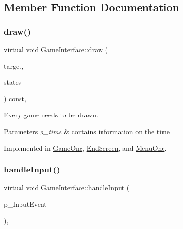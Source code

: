 \subsection{Member Function Documentation}
\mbox{\label{class_game_interface_ab33712e6b22b934982896ea0cab1699a}} 
\subsubsection{\texorpdfstring{draw()}{draw()}}
{\footnotesize\ttfamily virtual void Game\+Interface\+::draw (\begin{DoxyParamCaption}\item[{sf\+::\+Render\+Target \&}]{target,  }\item[{sf\+::\+Render\+States}]{states }\end{DoxyParamCaption}) const\hspace{0.3cm}{\ttfamily [protected]}, {}}



Every game needs to be drawn. 


\begin{DoxyParams}{Parameters}
{\em p\+\_\+time} & contains information on the time \\
\hline
\end{DoxyParams}


Implemented in \mbox{\hyperlink{class_game_one_af4df2785640103b623be240fa8be1e8a}{Game\+One}}, \mbox{\hyperlink{class_end_screen_a7116698624a0a4af8e746c50800fe432}{End\+Screen}}, and \mbox{\hyperlink{class_menu_one_a861529b6fcc30daebc753186714e3cc9}{Menu\+One}}.

\mbox{\label{class_game_interface_a48b4f6059c14c79359d30b77016a28f0}} 
\subsubsection{\texorpdfstring{handle\+Input()}{handleInput()}}
{\footnotesize\ttfamily virtual void Game\+Interface\+::handle\+Input (\begin{DoxyParamCaption}\item[{int}]{p\+\_\+\+Input\+Event }\end{DoxyParamCaption})\hspace{0.3cm}{\ttfamily [protected]}, {}}



